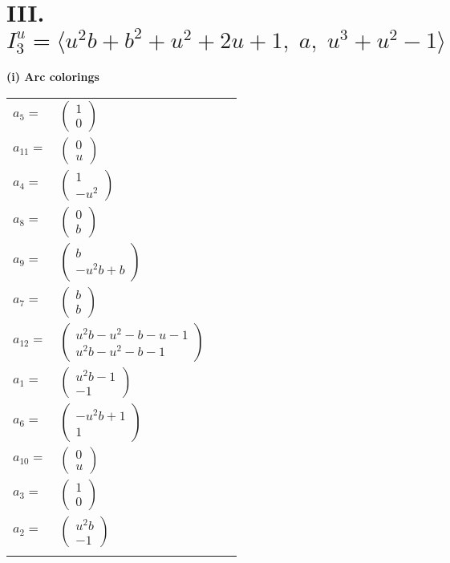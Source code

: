 \documentclass[1p]{elsarticle_modified}
\theoremstyle{definition}
\begin{document}
\centering \section*{III. $I^u_{3}= \langle u^2 b+b^2+u^2+2 u+1,\;a,\;u^3+u^2-1 \rangle$}
\flushleft \textbf{(i) Arc colorings}\\
\begin{tabular}{m{7pt} m{180pt} m{7pt} m{180pt} }
\flushright $a_{5}=$&$\begin{pmatrix}1\\0\end{pmatrix}$ \\
\flushright $a_{11}=$&$\begin{pmatrix}0\\u\end{pmatrix}$ \\
\flushright $a_{4}=$&$\begin{pmatrix}1\\- u^2\end{pmatrix}$ \\
\flushright $a_{8}=$&$\begin{pmatrix}0\\b\end{pmatrix}$ \\
\flushright $a_{9}=$&$\begin{pmatrix}b\\- u^2 b+b\end{pmatrix}$ \\
\flushright $a_{7}=$&$\begin{pmatrix}b\\b\end{pmatrix}$ \\
\flushright $a_{12}=$&$\begin{pmatrix}u^2 b- u^2- b- u-1\\u^2 b- u^2- b-1\end{pmatrix}$ \\
\flushright $a_{1}=$&$\begin{pmatrix}u^2 b-1\\-1\end{pmatrix}$ \\
\flushright $a_{6}=$&$\begin{pmatrix}- u^2 b+1\\1\end{pmatrix}$ \\
\flushright $a_{10}=$&$\begin{pmatrix}0\\u\end{pmatrix}$ \\
\flushright $a_{3}=$&$\begin{pmatrix}1\\0\end{pmatrix}$ \\
\flushright $a_{2}=$&$\begin{pmatrix}u^2 b\\-1\end{pmatrix}$\\&\end{tabular}
\end{document}
